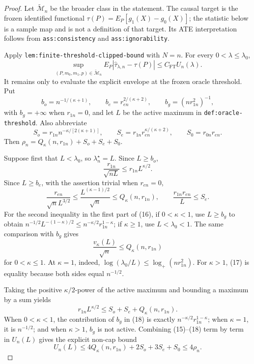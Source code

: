 \documentclass{article}
\begin{document}
\begin{proof}
Let \(\widetilde{\mathcal M}_n\) be the broader class in the statement.
The causal target is the frozen identified functional
\(\tau(P)=E_P[g_1(X)-g_0(X)]\); the statistic below is a sample map and is not
a definition of that target.  Its ATE interpretation follows from
\texttt{ass:consistency} and \texttt{ass:ignorability}.

Apply \texttt{lem:finite-threshold-clipped-bound} with \(N=n\).  For every
\(0<\lambda\leq\lambda_0\),
\[
\sup_{(P,m_0,m_1,p)\in\widetilde{\mathcal M}_n}
E_P|\widehat\tau_{\lambda,n}-\tau(P)|
\leq C_{\mathrm{FT}}U_n(\lambda).                                  \tag{14}
\]
It remains only to evaluate the explicit envelope at the frozen oracle
threshold.  Put
\[
b_o=n^{-1/(\kappa+1)},\qquad
b_e=r_{en}^{2/(\kappa+2)},\qquad
b_g=(nr_{1n}^2)^{-1},
\]
with \(b_g=+\infty\) when \(r_{1n}=0\), and let \(L\) be the active maximum
in \texttt{def:oracle-threshold}.  Also abbreviate
\[
S_o=r_{1n}n^{-\kappa/[2(\kappa+1)]},\qquad
S_e=r_{1n}r_{en}^{\kappa/(\kappa+2)},\qquad
S_0=r_{0n}r_{en}.
\]
Then \(\rho_n=Q_\kappa(n,r_{1n})+S_o+S_e+S_0\).

Suppose first that \(L<\lambda_0\), so
\(\lambda_n^\star=L\).  Since \(L\geq b_o\),
\[
\frac{r_{1n}}{\sqrt{nL}}
\leq r_{1n}L^{\kappa/2}.                                           \tag{15}
\]
Since \(L\geq b_e\), with the assertion trivial when \(r_{en}=0\),
\[
\frac{r_{en}}{\sqrt nL^{3/2}}
\leq\frac{L^{(\kappa-1)/2}}{\sqrt n}
\leq Q_\kappa(n,r_{1n}),
\qquad
\frac{r_{1n}r_{en}}L\leq S_e.                                     \tag{16}
\]
For the second inequality in the first part of (16), if \(0<\kappa<1\),
use \(L\geq b_g\) to obtain
\(n^{-1/2}L^{-(1-\kappa)/2}
\leq n^{-\kappa/2}r_{1n}^{1-\kappa}\); if \(\kappa\geq1\), use
\(L<\lambda_0<1\).  The same comparison with \(b_g\) gives
\[
\frac{v_\kappa(L)}{\sqrt n}\leq Q_\kappa(n,r_{1n})                 \tag{17}
\]
for \(0<\kappa\leq1\).  At \(\kappa=1\), indeed,
\(\log(\lambda_0/L)\leq\log_+(nr_{1n}^2)\).  For \(\kappa>1\),
(17) is equality because both sides equal \(n^{-1/2}\).

Taking the positive \(\kappa/2\)-power of the active maximum and bounding a
maximum by a sum yields
\[
r_{1n}L^{\kappa/2}
\leq S_o+S_e+Q_\kappa(n,r_{1n}).                                    \tag{18}
\]
When \(0<\kappa<1\), the contribution of \(b_g\) in (18) is exactly
\(n^{-\kappa/2}r_{1n}^{1-\kappa}\); when \(\kappa=1\), it is
\(n^{-1/2}\); and when \(\kappa>1\), \(b_g\) is not active.  Combining
(15)--(18) term by term in \(U_n(L)\) gives the explicit non-cap bound
\[
U_n(L)\leq4Q_\kappa(n,r_{1n})+2S_o+3S_e+S_0
\leq4\rho_n.                                                       \tag{19}
\]


\end{proof}
\end{document}
